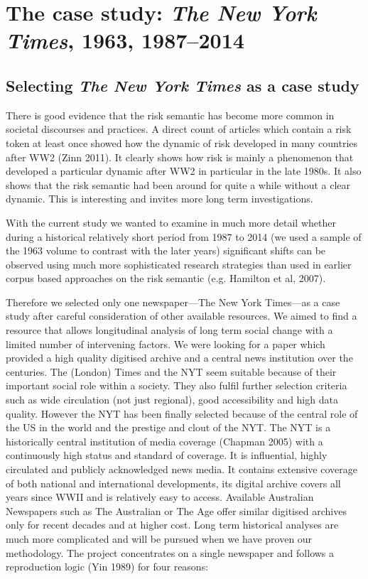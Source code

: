 
\chapter{The case study: \emph{The New York Times}, 1963, 1987--2014}

\section{Selecting \emph{The New York Times} as a case study}

There is good evidence that the risk semantic has become more common in societal discourses and practices. A direct count of articles which contain a risk token at least once showed how the dynamic of risk developed in many countries after WW2 (Zinn 2011). It clearly shows how risk is mainly a phenomenon that developed a particular dynamic after WW2 in particular in the late 1980s. It also shows that the risk semantic had been around for quite a while without a clear dynamic. This is interesting and invites more long term investigations.

With the current study we wanted to examine in much more detail whether during a historical relatively short period from 1987 to 2014 (we used a sample of the 1963 volume to contrast with the later years) significant shifts can be observed using much more sophisticated research strategies than used in earlier corpus based approaches on the risk semantic (e.g. Hamilton et al, 2007).

Therefore we selected only one newspaper---The New York Times---as a case study after careful consideration of other available resources. We aimed to find a resource that allows longitudinal analysis of long term social change with a limited number of intervening factors. We were looking for a paper which provided a high quality digitised archive and a central news institution over the centuries.
The (London) Times and the NYT seem suitable because of their important social role within a society. They also fulfil further selection criteria such as wide circulation (not just regional), good accessibility and high data quality. However the NYT has been finally selected because of the central role of the US in the world and the prestige and clout of the NYT. The NYT is a historically central institution of media coverage (Chapman 2005) with a continuously high status and standard of coverage. It is influential, highly circulated and publicly acknowledged news media. It contains extensive coverage of both national and international developments, its digital archive covers all years since WWII and is relatively easy to access.
Available Australian Newspapers such as The Australian or The Age offer similar digitised archives only for recent decades and at higher cost. Long term historical analyses are much more complicated and will be pursued when we have proven our methodology.
The project concentrates on a single newspaper and follows a reproduction logic (Yin 1989) for four reasons:

